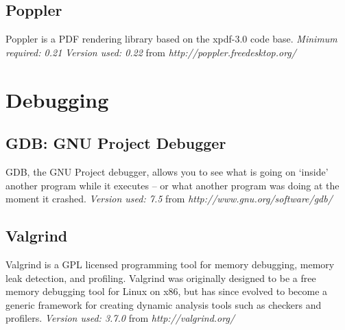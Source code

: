 \subsection{Poppler}
Poppler is a PDF rendering library based on the xpdf-3.0 code base. \newline
\emph{Minimum required: 0.21} \newline
\emph{Version used: 0.22} from \emph{http://poppler.freedesktop.org/}


\section{Debugging}
\subsection{GDB: GNU Project Debugger}
GDB, the GNU Project debugger, allows you to see what is going on `inside' another program while it executes -- or what another program was doing at the moment it crashed. \newline
\emph{Version used: 7.5} from \emph{http://www.gnu.org/software/gdb/}

\subsection{Valgrind}
Valgrind is a GPL licensed programming tool for memory debugging, memory leak detection, and profiling. Valgrind was originally designed to be a free memory debugging tool for Linux on x86, but has since evolved to become a generic framework for creating dynamic analysis tools such as checkers and profilers. \newline
\emph{Version used: 3.7.0} from \emph{http://valgrind.org/}
